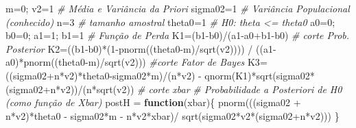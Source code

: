 \documentclass[
]{book}
\newenvironment{Shaded}{\begin{snugshade}}{\end{snugshade}}
\newcommand{\CommentTok}[1]{\textcolor[rgb]{0.56,0.35,0.01}{\textit{#1}}}
\newcommand{\ControlFlowTok}[1]{\textcolor[rgb]{0.13,0.29,0.53}{\textbf{#1}}}
\newcommand{\DecValTok}[1]{\textcolor[rgb]{0.00,0.00,0.81}{#1}}
\newcommand{\FunctionTok}[1]{\textcolor[rgb]{0.00,0.00,0.00}{#1}}
\newcommand{\NormalTok}[1]{#1}
\newcommand{\OtherTok}[1]{\textcolor[rgb]{0.56,0.35,0.01}{#1}}
\newcommand{\SpecialCharTok}[1]{\textcolor[rgb]{0.00,0.00,0.00}{#1}}
\begin{document}
\begin{Shaded}
\begin{Highlighting}[]
\NormalTok{m}\OtherTok{=}\DecValTok{0}\NormalTok{; v2}\OtherTok{=}\DecValTok{1} \CommentTok{\# Média e Variância da Priori}
\NormalTok{sigma02}\OtherTok{=}\DecValTok{1} \CommentTok{\# Variância Populacional (conhecido)}
\NormalTok{n}\OtherTok{=}\DecValTok{3} \CommentTok{\# tamanho amostral}
\NormalTok{theta0}\OtherTok{=}\DecValTok{1} \CommentTok{\# H0: theta \textless{}= theta0}
\NormalTok{a0}\OtherTok{=}\DecValTok{0}\NormalTok{; b0}\OtherTok{=}\DecValTok{0}\NormalTok{; a1}\OtherTok{=}\DecValTok{1}\NormalTok{; b1}\OtherTok{=}\DecValTok{1} \CommentTok{\# Função de Perda}
\NormalTok{K1}\OtherTok{=}\NormalTok{(b1}\SpecialCharTok{{-}}\NormalTok{b0)}\SpecialCharTok{/}\NormalTok{(a1}\SpecialCharTok{{-}}\NormalTok{a0}\SpecialCharTok{+}\NormalTok{b1}\SpecialCharTok{{-}}\NormalTok{b0) }\CommentTok{\# corte Prob. Posterior}
\NormalTok{K2}\OtherTok{=}\NormalTok{((b1}\SpecialCharTok{{-}}\NormalTok{b0)}\SpecialCharTok{*}\NormalTok{(}\DecValTok{1}\SpecialCharTok{{-}}\FunctionTok{pnorm}\NormalTok{((theta0}\SpecialCharTok{{-}}\NormalTok{m)}\SpecialCharTok{/}\FunctionTok{sqrt}\NormalTok{(v2)))) }\SpecialCharTok{/}\NormalTok{ ((a1}\SpecialCharTok{{-}}\NormalTok{a0)}\SpecialCharTok{*}\FunctionTok{pnorm}\NormalTok{((theta0}\SpecialCharTok{{-}}\NormalTok{m)}\SpecialCharTok{/}\FunctionTok{sqrt}\NormalTok{(v2))) }\CommentTok{\#corte Fator de Bayes}
\NormalTok{K3}\OtherTok{=}\NormalTok{((sigma02}\SpecialCharTok{+}\NormalTok{n}\SpecialCharTok{*}\NormalTok{v2)}\SpecialCharTok{*}\NormalTok{theta0}\SpecialCharTok{{-}}\NormalTok{sigma02}\SpecialCharTok{*}\NormalTok{m)}\SpecialCharTok{/}\NormalTok{(n}\SpecialCharTok{*}\NormalTok{v2) }\SpecialCharTok{{-}} \FunctionTok{qnorm}\NormalTok{(K1)}\SpecialCharTok{*}\FunctionTok{sqrt}\NormalTok{(sigma02}\SpecialCharTok{*}\NormalTok{(sigma02}\SpecialCharTok{+}\NormalTok{n}\SpecialCharTok{*}\NormalTok{v2))}\SpecialCharTok{/}\NormalTok{(n}\SpecialCharTok{*}\FunctionTok{sqrt}\NormalTok{(v2)) }\CommentTok{\# corte xbar}
\CommentTok{\# Probabilidade a Posteriori de H0 (como função de Xbar)}
\NormalTok{postH }\OtherTok{=} \ControlFlowTok{function}\NormalTok{(xbar)\{}
  \FunctionTok{pnorm}\NormalTok{(((sigma02 }\SpecialCharTok{+}\NormalTok{ n}\SpecialCharTok{*}\NormalTok{v2)}\SpecialCharTok{*}\NormalTok{theta0 }\SpecialCharTok{{-}}\NormalTok{ sigma02}\SpecialCharTok{*}\NormalTok{m }\SpecialCharTok{{-}}\NormalTok{ n}\SpecialCharTok{*}\NormalTok{v2}\SpecialCharTok{*}\NormalTok{xbar)}\SpecialCharTok{/} \FunctionTok{sqrt}\NormalTok{(sigma02}\SpecialCharTok{*}\NormalTok{v2}\SpecialCharTok{*}\NormalTok{(sigma02}\SpecialCharTok{+}\NormalTok{n}\SpecialCharTok{*}\NormalTok{v2))) \}}

\end{Highlighting}
\end{Shaded}
\end{document}
